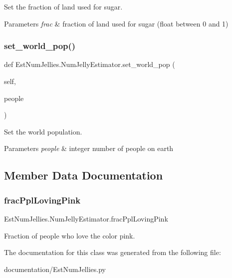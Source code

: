 Set the fraction of land used for sugar. 


\begin{DoxyParams}{Parameters}
{\em frac} & fraction of land used for sugar (float between 0 and 1) \\
\hline
\end{DoxyParams}
\mbox{\label{class_est_num_jellies_1_1_num_jelly_estimator_a0244b2d3252a7b1d7106fae186121d75}} 
\subsubsection{\texorpdfstring{set\+\_\+world\+\_\+pop()}{set\_world\_pop()}}
{\footnotesize\ttfamily def Est\+Num\+Jellies.\+Num\+Jelly\+Estimator.\+set\+\_\+world\+\_\+pop (\begin{DoxyParamCaption}\item[{}]{self,  }\item[{}]{people }\end{DoxyParamCaption})}



Set the world population. 


\begin{DoxyParams}{Parameters}
{\em people} & integer number of people on earth \\
\hline
\end{DoxyParams}


\subsection{Member Data Documentation}
\mbox{\label{class_est_num_jellies_1_1_num_jelly_estimator_adf6fe4e805106a7316b3202cc5c3470e}} 
\subsubsection{\texorpdfstring{frac\+Ppl\+Loving\+Pink}{fracPplLovingPink}}
{\footnotesize\ttfamily Est\+Num\+Jellies.\+Num\+Jelly\+Estimator.\+frac\+Ppl\+Loving\+Pink}



Fraction of people who love the color pink. 



The documentation for this class was generated from the following file\+:\begin{DoxyCompactItemize}
\item 
documentation/Est\+Num\+Jellies.\+py\end{DoxyCompactItemize}

